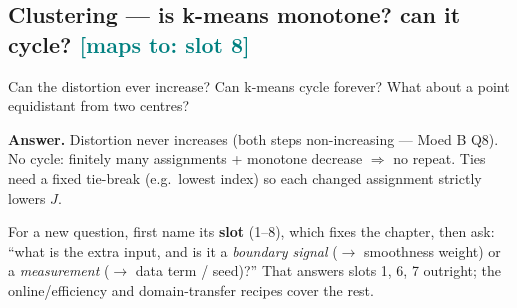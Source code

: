 \documentclass[11pt]{article}
\newcommand{\maps}[1]{{\small\textcolor{teal}{[maps to: #1]}}}
\newcommand{\ans}[1]{\begin{answer}\textbf{Answer.} #1\end{answer}}
\begin{document}
\subsection{Clustering --- is k-means monotone? can it cycle? \hfill \maps{slot 8}}
Can the distortion ever increase? Can k-means cycle forever? What about a point equidistant from two centres?
\ans{Distortion never increases (both steps non-increasing --- Moed B Q8). No cycle: finitely many assignments +
monotone decrease $\Rightarrow$ no repeat. Ties need a fixed tie-break (e.g.\ lowest index) so each changed
assignment strictly lowers $J$.}

\vspace{1em}
\begin{tcolorbox}[colback=teal!5,colframe=teal!60!black,title=\textbf{Study tip}]
For a new question, first name its \textbf{slot} (1--8), which fixes the chapter, then ask: ``what is the extra
input, and is it a \emph{boundary signal} (${\to}$ smoothness weight) or a \emph{measurement} (${\to}$ data term /
seed)?'' That answers slots 1, 6, 7 outright; the online/efficiency and domain-transfer recipes cover the rest.
\end{tcolorbox}
\end{document}
